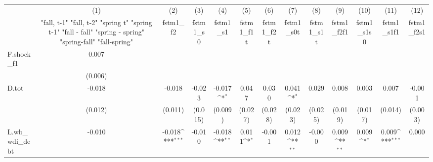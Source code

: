 {
\def\sym#1{\ifmmode^{#1}\else\(^{#1}\)\fi}
\begin{tabular}{l*{12}{c}}
\toprule
            &\multicolumn{1}{c}{(1)}&\multicolumn{1}{c}{(2)}&\multicolumn{1}{c}{(3)}&\multicolumn{1}{c}{(4)}&\multicolumn{1}{c}{(5)}&\multicolumn{1}{c}{(6)}&\multicolumn{1}{c}{(7)}&\multicolumn{1}{c}{(8)}&\multicolumn{1}{c}{(9)}&\multicolumn{1}{c}{(10)}&\multicolumn{1}{c}{(11)}&\multicolumn{1}{c}{(12)}\\
            &\multicolumn{1}{c}{  "fall, t-1" "fall, t-2" "spring t" "spring t-1"  "fall - fall" "spring - spring" "spring-fall" "fall-spring" }&\multicolumn{1}{c}{fstm1\_f2}&\multicolumn{1}{c}{fstm1\_s0}&\multicolumn{1}{c}{fstm1\_s1}&\multicolumn{1}{c}{fstm1\_f1t}&\multicolumn{1}{c}{fstm1\_f2t}&\multicolumn{1}{c}{fstm1\_s0t}&\multicolumn{1}{c}{fstm1\_s1t}&\multicolumn{1}{c}{fstm1\_f2f1}&\multicolumn{1}{c}{fstm1\_s1s0}&\multicolumn{1}{c}{fstm1\_s1f1}&\multicolumn{1}{c}{fstm1\_f2s1}\\
\midrule
F.shock\_f1  &       0.007         &                     &                     &                     &                     &                     &                     &                     &                     &                     &                     &                     \\
            &     (0.006)         &                     &                     &                     &                     &                     &                     &                     &                     &                     &                     &                     \\
\addlinespace
D.tot       &      -0.018         &      -0.018         &      -0.023         &      -0.017\sym{*}  &       0.047         &       0.030         &       0.041\sym{*}  &       0.029         &       0.008         &       0.003         &       0.007         &      -0.001         \\
            &     (0.012)         &     (0.011)         &     (0.015)         &     (0.009)         &     (0.027)         &     (0.028)         &     (0.023)         &     (0.025)         &     (0.019)         &     (0.017)         &     (0.014)         &     (0.003)         \\
\addlinespace
L.wb\_wdi\_debt&      -0.010         &      -0.018\sym{***}&      -0.010         &      -0.018\sym{**} &       0.011\sym{*}  &      -0.001         &       0.012\sym{**} &      -0.000         &       0.009\sym{**} &       0.009\sym{*}  &       0.009\sym{***}&       0.000         \\

\end{tabular}}
